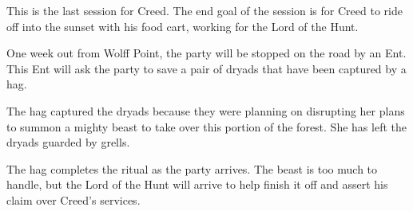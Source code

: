 This is the last session for Creed.
The end goal of the session is for Creed to ride off into the sunset with his food cart, working for the Lord of the Hunt.

One week out from Wolff Point, the party will be stopped on the road by an Ent.
This Ent will ask the party to save a pair of dryads that have been captured by a hag.

The hag captured the dryads because they were planning on disrupting her plans to summon a mighty beast to take over this portion of the forest.
She has left the dryads guarded by grells.

The hag completes the ritual as the party arrives.
The beast is too much to handle, but the Lord of the Hunt will arrive to help finish it off and assert his claim over Creed's services.
